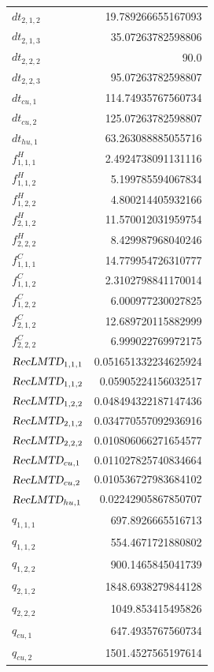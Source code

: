 \documentclass{article}%
\begin{document}
\begin{multicols*}{3}
\begin{supertabular}{lr}
	$dt_{2,1,2}$ & 19.789266655167093 \\%
	$dt_{2,1,3}$ & 35.07263782598806 \\%
	$dt_{2,2,2}$ & 90.0 \\%
	$dt_{2,2,3}$ & 95.07263782598807 \\%
	$dt_{cu,1}$ & 114.74935767560734 \\%
	$dt_{cu,2}$ & 125.07263782598807 \\%
	$dt_{hu,1}$ & 63.263088885055716 \\%
	$f_{1,1,1}^{H}$ & 2.4924738091131116 \\%
	$f_{1,1,2}^{H}$ & 5.199785594067834 \\%
	$f_{1,2,2}^{H}$ & 4.800214405932166 \\%
	$f_{2,1,2}^{H}$ & 11.570012031959754 \\%
	$f_{2,2,2}^{H}$ & 8.429987968040246 \\%
	$f_{1,1,1}^{C}$ & 14.779954726310777 \\%
	$f_{1,1,2}^{C}$ & 2.3102798841170014 \\%
	$f_{1,2,2}^{C}$ & 6.000977230027825 \\%
	$f_{2,1,2}^{C}$ & 12.689720115882999 \\%
	$f_{2,2,2}^{C}$ & 6.999022769972175 \\%
	$\textsl{RecLMTD}_{1,1,1}$ & 0.051651332234625924 \\%
	$\textsl{RecLMTD}_{1,1,2}$ & 0.05905224156032517 \\%
	$\textsl{RecLMTD}_{1,2,2}$ & 0.048494322187147436 \\%
	$\textsl{RecLMTD}_{2,1,2}$ & 0.034770557092936916 \\%
	$\textsl{RecLMTD}_{2,2,2}$ & 0.010806066271654577 \\%
	$\textsl{RecLMTD}_{cu,1}$ & 0.011027825740834664 \\%
	$\textsl{RecLMTD}_{cu,2}$ & 0.010536727983684102 \\%
	$\textsl{RecLMTD}_{hu,1}$ & 0.02242905867850707 \\%
	$q_{1,1,1}$ & 697.8926665516713 \\%
	$q_{1,1,2}$ & 554.4671721880802 \\%
	$q_{1,2,2}$ & 900.1465845041739 \\%
	$q_{2,1,2}$ & 1848.6938279844128 \\%
	$q_{2,2,2}$ & 1049.853415495826 \\%
	$q_{cu,1}$ & 647.4935767560734 \\%
	$q_{cu,2}$ & 1501.4527565197614 \\%

\end{supertabular}
\end{multicols*}
\end{document}
